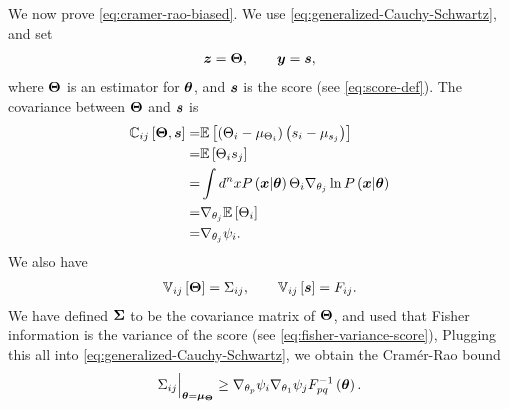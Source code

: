We now prove \eqref{eq:cramer-rao-biased}.
We use \eqref{eq:generalized-Cauchy-Schwartz}, and set
\begin{align}
    {\bm z}
    =
    {\bm \Theta}
    ,\qquad
    {\bm y}
    =
    {\bm s}
    ,
\end{align}
where ${\bm \Theta}$ is an estimator for ${\bm \theta}$,
and ${\bm s}$ is the score (see \eqref{eq:score-def}). 
The covariance between ${\bm \Theta}$ and ${\bm s}$ is
\begin{align}
    \mathbb{C}_{ij}\left[{\bm \Theta},{\bm s}\right]
    =&
    \mathbb{E}\left[
        \left(\Theta_i-\mu_{\Theta_i}\right)
        \left(s_i-\mu_{s_j}\right)
    \right]
    \nonumber\\
    =&
    \mathbb{E}\left[\Theta_is_j\right]
    \nonumber\\
    =&
    \int d^nx P\left({\bm x}|{\bm \theta}\right) \Theta_i \nabla_{\theta_j} \ln P\left({\bm x}|{\bm \theta}\right)
    \nonumber\\
    =&
    \nabla_{\theta_j}\mathbb{E}\left[\Theta_i\right]
    \nonumber\\
    =&
    \nabla_{\theta_j}\psi_i
    .
\end{align}
We also have 
\begin{align}
    \mathbb{V}_{ij}\left[{\bm \Theta}\right]
    =
    \Sigma_{ij}
    ,\qquad
    \mathbb{V}_{ij}\left[{\bm s}\right]
    =
    F_{ij}
    .
\end{align}
We have defined ${\bm \Sigma}$ to be the covariance matrix of ${\bm \Theta}$, 
and used that Fisher information is the variance of the score 
(see \eqref{eq:fisher-variance-score}),
Plugging this all into \eqref{eq:generalized-Cauchy-Schwartz}, 
we obtain the Cram\'{e}r-Rao bound
\begin{align}
    \Sigma_{ij}\Big|_{{\bm \theta}={\bm \mu}_{{\bm \Theta}}} 
    \geq 
    \nabla_{\theta_p}\psi_i
    \nabla_{\theta_1}\psi_j
    F_{pq}^{-1}\left({\bm \theta}\right) 
    .
\end{align}
